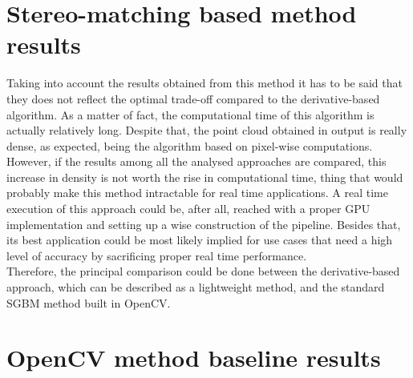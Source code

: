 \section{Stereo-matching based method results}
\label{section:stereo-match-results}

Taking into account the results obtained from this method it has to be said that they does not reflect the optimal trade-off compared to the derivative-based algorithm.
As a matter of fact, the computational time of this algorithm is actually relatively long. 
Despite that, the point cloud obtained in output is really dense, as expected, being the algorithm based on pixel-wise computations. 
However, if the results among all the analysed approaches are compared, this increase in density is not worth the rise in computational time, thing that would probably make this method intractable for real time applications.
A real time execution of this approach could be, after all, reached with a proper GPU implementation and setting up a wise construction of the pipeline.
Besides that, its best application could be most likely implied for use cases that need a high level of accuracy by sacrificing proper real time performance.\\
Therefore, the principal comparison could be done between the derivative-based approach, which can be described as a lightweight method, and the standard SGBM method built in OpenCV.


\section{OpenCV method baseline results}
\label{section:opencv-baseline-results}

